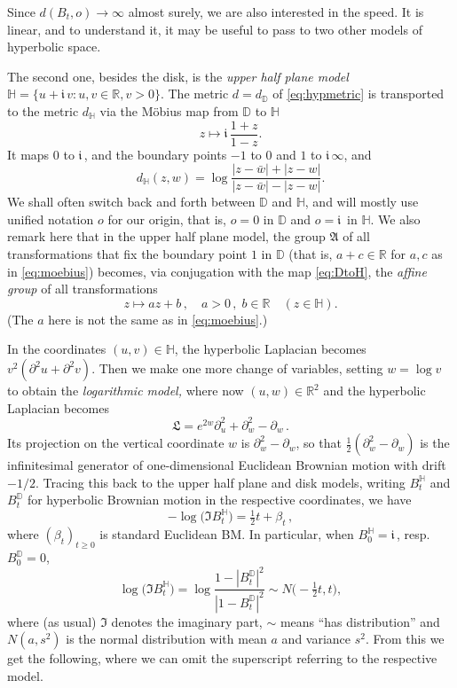 \documentclass[12pt]{amsart}
\newcommand\Aff{\mathfrak A}
\newcommand\DD{\mathbb D}
\newcommand\HH{\mathbb H}
\newcommand\im{\mathfrak{i}\,}
\newcommand\Lap{\mathfrak{L}}
\newcommand\R{\mathbb R}
\newcommand\ro{d}
\numberwithin{theorem}{section}
\theoremstyle{definition}
\begin{document}
Since $\ro( B_t, o) \to \infty$ almost surely, we are also interested in
the speed. It is linear, and to understand it, it may be useful to pass to
two other models of hyperbolic space.

The second one, besides the disk, is the \emph{upper half plane model} 
$\HH = \{ u + \im v : u,v \in \R, v > 0\}$.
The metric $\ro = \ro_{\DD}$ of \eqref{eq:hypmetric} is transported to the
metric $\ro_{\HH}$ via the M\"obius map from $\DD$ to $\HH$
\begin{equation}\label{eq:DtoH}
z \mapsto \im \frac{1+z}{1-z}.
\end{equation}
It maps $0$ to $\im$, and the boundary points $-1$ to $0$ and $1$ to $\im\infty$,
and
\begin{equation}\label{eq:hmetric}
\ro_{\HH}(z,w) = \log\frac{|z-\bar w| + |z-w|}{|z-\bar w| - |z-w|}.
\end{equation}
We shall often switch back and forth between $\DD$ and $\HH$, and will mostly use  
unified notation $o$ for our origin, that is, $o = 0$ in $\DD$ and $o=\im$ in $\HH$.
We also remark here that in the upper half plane model, the group $\Aff$ of all transformations
that fix the boundary point $1$ in $\DD$ (that is, $a+c \in \R$ for $a, c$ as in \eqref{eq:moebius}) 
becomes, via conjugation with the map \eqref{eq:DtoH},  the \emph{affine group} of all transformations
$$
z \mapsto az + b\,, \quad a> 0\,,\; b \in \R \quad (z \in \HH).
$$
(The $a$ here is not the same as in \eqref{eq:moebius}.)

In the coordinates $(u,v) \in \HH$, the 
hyperbolic Laplacian becomes $v^2 (\partial^2 u + \partial^2 v)$.
Then we make one more change of variables,
setting $w = \log v$ to obtain the \emph{logarithmic model,} where now $(u,w) \in \R^2$ and
the hyperbolic Laplacian becomes
$$  %
\Lap = e^{2w} \partial^2_u + \partial^2_w - \partial_w\,.
$$ %
Its projection on the vertical coordinate $w$ is $\partial^2_w - \partial_w$, so that 
$\frac12(\partial^2_w - \partial_w)$ is the infinitesimal generator of 
one-dimensional Euclidean Brownian motion with drift $-1/2$. Tracing this back to the
upper half plane and disk models, writing $B_t^{\HH}$ and $B_t^{\DD}$ for hyperbolic
Brownian motion in the respective coordinates, we have 
\begin{equation}\label{eq:im}
- \log \bigl(\Im B_t^{\HH}\bigr) = \tfrac{1}{2}t + \beta_t\,,
\end{equation} 
where $(\beta_t)_{t \ge 0}$ is standard Euclidean BM. In particular,
when $B_0^{\HH}=\im$, resp. $B_0^{\DD}=0$,
\begin{equation}\label{eq:normal}
\log \bigl(\Im B_t^{\HH}\bigr)  = \log \frac{1-|B_t^{\DD}|^2}{|1-B_t^{\DD}|^2}
\sim N\bigl(-\tfrac12 t, t\bigr),
\end{equation}
where (as usual) $\Im$ denotes the imaginary part, $\sim$ means ``has distribution'' 
and $N(a,s^2)$ is the normal distribution with mean $a$ and variance $s^2$.
From this we get the following, where we can omit the superscript referring to the respective model.
\end{document}

